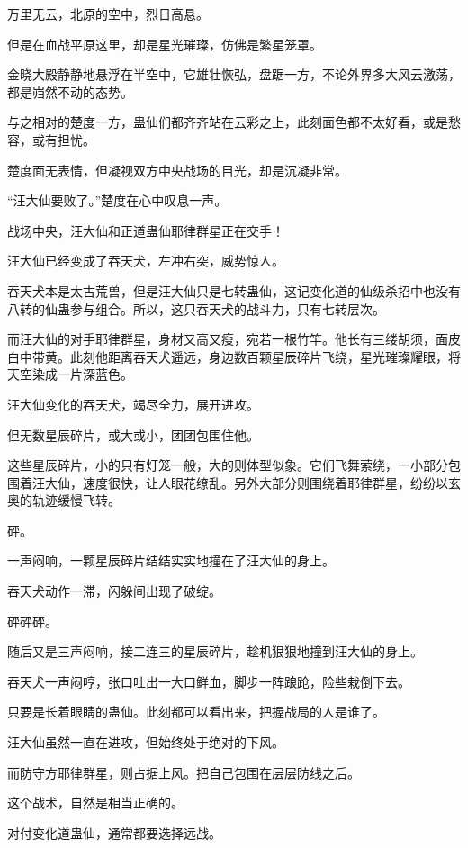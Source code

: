 
\begin{this_body}

万里无云，北原的空中，烈日高悬。

但是在血战平原这里，却是星光璀璨，仿佛是繁星笼罩。

金晓大殿静静地悬浮在半空中，它雄壮恢弘，盘踞一方，不论外界多大风云激荡，都是岿然不动的态势。

与之相对的楚度一方，蛊仙们都齐齐站在云彩之上，此刻面色都不太好看，或是愁容，或有担忧。

楚度面无表情，但凝视双方中央战场的目光，却是沉凝非常。

“汪大仙要败了。”楚度在心中叹息一声。

战场中央，汪大仙和正道蛊仙耶律群星正在交手！

汪大仙已经变成了吞天犬，左冲右突，威势惊人。

吞天犬本是太古荒兽，但是汪大仙只是七转蛊仙，这记变化道的仙级杀招中也没有八转的仙蛊参与组合。所以，这只吞天犬的战斗力，只有七转层次。

而汪大仙的对手耶律群星，身材又高又瘦，宛若一根竹竿。他长有三缕胡须，面皮白中带黄。此刻他距离吞天犬遥远，身边数百颗星辰碎片飞绕，星光璀璨耀眼，将天空染成一片深蓝色。

汪大仙变化的吞天犬，竭尽全力，展开进攻。

但无数星辰碎片，或大或小，团团包围住他。

这些星辰碎片，小的只有灯笼一般，大的则体型似象。它们飞舞萦绕，一小部分包围着汪大仙，速度很快，让人眼花缭乱。另外大部分则围绕着耶律群星，纷纷以玄奥的轨迹缓慢飞转。

砰。

一声闷响，一颗星辰碎片结结实实地撞在了汪大仙的身上。

吞天犬动作一滞，闪躲间出现了破绽。

砰砰砰。

随后又是三声闷响，接二连三的星辰碎片，趁机狠狠地撞到汪大仙的身上。

吞天犬一声闷哼，张口吐出一大口鲜血，脚步一阵踉跄，险些栽倒下去。

只要是长着眼睛的蛊仙。此刻都可以看出来，把握战局的人是谁了。

汪大仙虽然一直在进攻，但始终处于绝对的下风。

而防守方耶律群星，则占据上风。把自己包围在层层防线之后。

这个战术，自然是相当正确的。

对付变化道蛊仙，通常都要选择远战。


\end{this_body}
